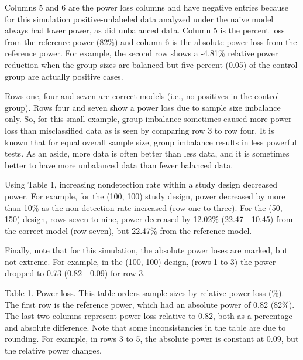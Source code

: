 \documentclass[
]{article}
\begin{document}
Columns 5 and 6 are the power loss columns and have negative entries
because for this simulation positive-unlabeled data analyzed under the
naive model always had lower power, as did unbalanced data. Column 5 is
the percent loss from the reference power (82\%) and column 6 is the
absolute power loss from the reference power. For example, the second
row shows a -4.81\% relative power reduction when the group sizes are
balanced but five percent (0.05) of the control group are actually
positive cases.

Rows one, four and seven are correct models (i.e., no positives in the
control group). Rows four and seven show a power loss due to sample size
imbalance only. So, for this small example, group imbalance sometimes
caused more power loss than misclassified data as is seen by comparing
row 3 to row four. It is known that for equal overall sample size, group
imbalance results in less powerful tests. As an aside, more data is
often better than less data, and it is sometimes better to have more
unbalanced data than fewer balanced data.

Using Table 1, increasing nondetection rate within a study design
decreased power. For example, for the (100, 100) study design, power
decreased by more than 10\% as the non-detection rate increased (row one
to three). For the (50, 150) design, rows seven to nine, power decreased
by 12.02\% (22.47 - 10.45) from the correct model (row seven), but
22.47\% from the reference model.

Finally, note that for this simulation, the absolute power loses are
marked, but not extreme. For example, in the (100, 100) design, (rows 1
to 3) the power dropped to 0.73 (0.82 - 0.09) for row 3.

\pagebreak

Table 1. Power loss. This table orders sample sizes by relative power
loss (\%). The first row is the reference power, which had an absolute
power of 0.82 (82\%). The last two columns represent power loss relative
to 0.82, both as a percentage and absolute difference. Note that some
inconsistancies in the table are due to rounding. For example, in rows 3
to 5, the absolute power is constant at 0.09, but the relative power
changes.
\end{document}
